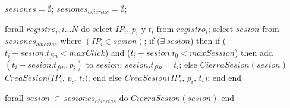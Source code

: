 $sesiones = \emptyset$;
$sesiones_{abiertas} = \emptyset$;

forall $registro_i, i\ldots N$ do
	select $IP_i$, $p_i$ y $t_i$ from $registro_i$;
	select $sesion$ from $sesiones_{abiertas}$ where $(IP_i \in sesion)$;
	if ($\exists\ sesion$) then
		if ($t_i - sesion.t_{fin} < maxClick$) and 
       ($t_i - sesion.t_0 < maxSession$) then
			add $(t_i - sesion.t_{fin}, p_i)$ to $sesion$;
			$sesion.t_{fin} = t_i$;
		else
			$CierraSesion(sesion)$
			$CreaSesion(IP_i$, $p_i$, $t_i)$;
		end
	else
		$CreaSesion(IP_i$, $p_i$, $t_i)$;
	end
end

forall $sesion\ \in\ sesiones_{abiertas}$ do
	$CierraSesion(sesion)$
end